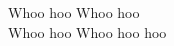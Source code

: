 \songwordfb{~}
\songwordfb{~}
Whoo \songwordcount{3\textonehalf}hoo 
\songwordfb{~}
Whoo \songwordcount{3\textonehalf}hoo \\
 \songwordfb{~} Whoo hoo  \songwordfb{~} Whoo hoo hoo
